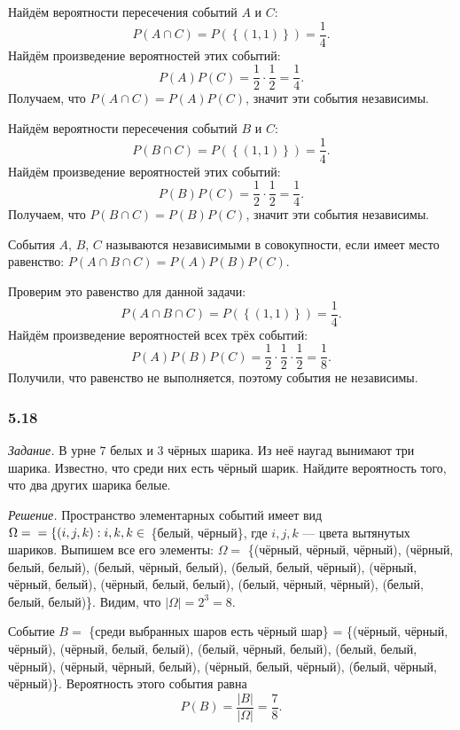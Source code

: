 Найдём вероятности пересечения событий $A$ и $C$:
$$P \left( A \cap C \right) =
P \left( \left\{ \left( 1, 1 \right) \right\} \right) =
\frac{1}{4}.$$
Найдём произведение вероятностей этих событий:
$$P \left( A \right) P \left( C \right) =
\frac{1}{2} \cdot \frac{1}{2} =
\frac{1}{4}.$$
Получаем, что $P \left( A \cap C \right) = P \left( A \right) P \left( C \right) $, значит эти события независимы.

Найдём вероятности пересечения событий $B$ и $C$:
$$P \left( B \cap C \right) =
P \left( \left\{ \left( 1, 1 \right) \right\} \right) =
\frac{1}{4}.$$
Найдём произведение вероятностей этих событий:
$$P \left( B \right) P \left( C \right) =
\frac{1}{2} \cdot \frac{1}{2} =
\frac{1}{4}.$$
Получаем, что $P \left( B \cap C \right) = P \left( B \right) P \left( C \right) $, значит эти события независимы.

События $A, \, B, \, C$ называются независимыми в совокупности, если имеет место равенство:
$P \left( A \cap B \cap C \right) =
P \left( A \right) P \left( B \right) P \left( C \right) $.

Проверим это равенство для данной задачи:
$$P \left( A \cap B \cap C \right) =
P \left( \left\{ \left( 1, 1 \right) \right\} \right) =
\frac{1}{4}.$$
Найдём произведение вероятностей всех трёх событий:
$$P \left( A \right) P \left( B \right) P \left( C \right) =
\frac{1}{2} \cdot \frac{1}{2} \cdot \frac{1} {2} =
\frac{1}{8}.$$
Получили, что равенство не выполняется, поэтому события не независимы.

\subsubsection*{5.18}

\textit{Задание.} В урне $7$ белых и $3$ чёрных шарика.
Из неё наугад вынимают три шарика.
Известно, что среди них есть чёрный шарик.
Найдите вероятность того, что два других шарика белые.

\textit{Решение.}
Пространство элементарных событий имеет вид
$ \Omega = \\ = \left\{ \left( i, j, k \right): i, k, k \in \right.$ \{белый, чёрный\}, где $i, j, k$ --- цвета вытянутых шариков.
Выпишем все его элементы: $ \Omega = $ \{(чёрный, чёрный, чёрный), (чёрный, белый, белый), (белый, чёрный, белый), (белый, белый, чёрный),
(чёрный, чёрный, белый), (чёрный, белый, белый), (белый, чёрный, чёрный), (белый, белый, белый)\}.
Видим, что $ \left| \Omega \right| = 2^3 = 8$.

Событие $B =$ \{среди выбранных шаров есть чёрный шар\} = \{(чёрный, чёрный, чёрный),
(чёрный, белый, белый), (белый, чёрный, белый), (белый, белый, чёрный),
(чёрный, чёрный, белый), (чёрный, белый, чёрный), (белый, чёрный, чёрный)\}.
Вероятность этого события равна
$$P \left( B \right) =
\frac{ \left| B \right| }{ \left| \Omega \right| } =
\frac{7}{8}.$$


